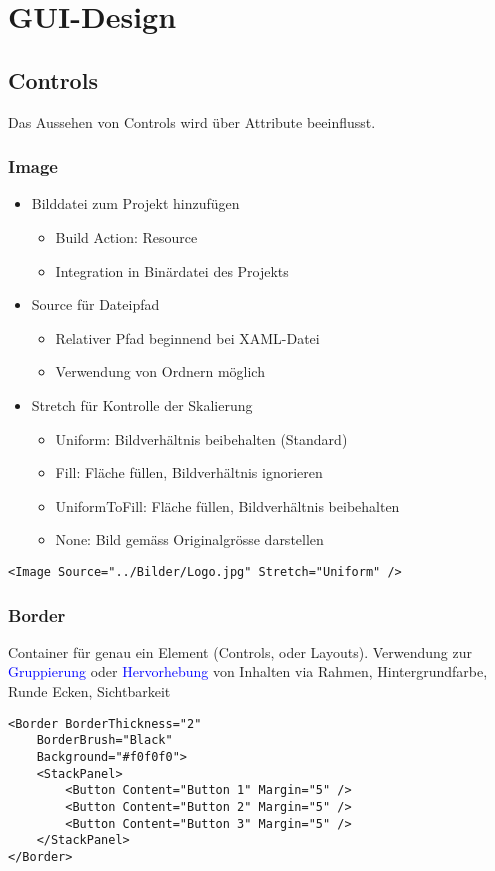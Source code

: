 
\section{GUI-Design}
\subsection{Controls}
Das Aussehen von Controls wird über Attribute beeinflusst.
\subsubsection{Image}
\begin{itemize}[topsep=0pt, leftmargin=4mm]
    \setlength\itemsep{-0.3em}
    \item Bilddatei zum Projekt hinzufügen
    \begin{itemize}[topsep=0pt, leftmargin=4mm]
        \setlength\itemsep{-0.3em}
        \item Build Action: Resource
        \item Integration in Binärdatei des Projekts
    \end{itemize}
    \item Source für Dateipfad
    \begin{itemize}[topsep=0pt, leftmargin=4mm]
        \setlength\itemsep{-0.3em}
        \item Relativer Pfad beginnend bei XAML-Datei
        \item Verwendung von Ordnern möglich
    \end{itemize}
    \item Stretch für Kontrolle der Skalierung
    \begin{itemize}[topsep=0pt, leftmargin=4mm]
        \setlength\itemsep{-0.3em}
        \item Uniform: Bildverhältnis beibehalten (Standard)
        \item Fill: Fläche füllen, Bildverhältnis ignorieren
        \item UniformToFill: Fläche füllen, Bildverhältnis beibehalten
        \item None: Bild gemäss Originalgrösse darstellen
    \end{itemize}
\end{itemize}
\begin{lstlisting}
<Image Source="../Bilder/Logo.jpg" Stretch="Uniform" />
\end{lstlisting}
\subsubsection{Border}
Container für genau ein Element (Controls, oder Layouts). Verwendung zur \textcolor{blue}{Gruppierung} oder \textcolor{blue}{Hervorhebung} von Inhalten via Rahmen, Hintergrundfarbe, Runde Ecken, Sichtbarkeit
\begin{lstlisting}
<Border BorderThickness="2"
    BorderBrush="Black"
    Background="#f0f0f0">
    <StackPanel>
        <Button Content="Button 1" Margin="5" />
        <Button Content="Button 2" Margin="5" />
        <Button Content="Button 3" Margin="5" />
    </StackPanel>
</Border>
\end{lstlisting}
